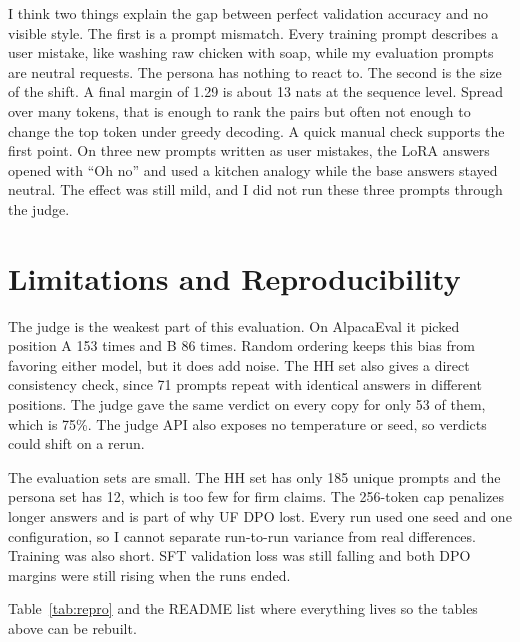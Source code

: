 \documentclass[11pt]{article}
\begin{document}
I think two things explain the gap between perfect validation accuracy and no visible style.
The first is a prompt mismatch.
Every training prompt describes a user mistake, like washing raw chicken with soap, while my evaluation prompts are neutral requests.
The persona has nothing to react to.
The second is the size of the shift.
A final margin of 1.29 is about 13 nats at the sequence level.
Spread over many tokens, that is enough to rank the pairs but often not enough to change the top token under greedy decoding.
A quick manual check supports the first point.
On three new prompts written as user mistakes, the LoRA answers opened with ``Oh no'' and used a kitchen analogy while the base answers stayed neutral.
The effect was still mild, and I did not run these three prompts through the judge.

\section{Limitations and Reproducibility}

The judge is the weakest part of this evaluation.
On AlpacaEval it picked position A 153 times and B 86 times.
Random ordering keeps this bias from favoring either model, but it does add noise.
The HH set also gives a direct consistency check, since 71 prompts repeat with identical answers in different positions.
The judge gave the same verdict on every copy for only 53 of them, which is 75\%.
The judge API also exposes no temperature or seed, so verdicts could shift on a rerun.

The evaluation sets are small.
The HH set has only 185 unique prompts and the persona set has 12, which is too few for firm claims.
The 256-token cap penalizes longer answers and is part of why UF DPO lost.
Every run used one seed and one configuration, so I cannot separate run-to-run variance from real differences.
Training was also short.
SFT validation loss was still falling and both DPO margins were still rising when the runs ended.

Table~\ref{tab:repro} and the README list where everything lives so the tables above can be rebuilt.
\end{document}
